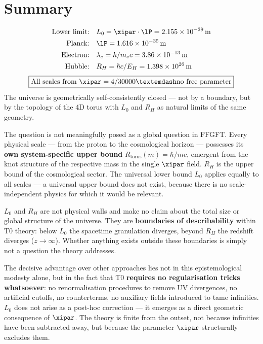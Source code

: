 \section{Summary}

\begin{keyresult}[Complete Scale Hierarchy from \texorpdfstring{$\xipar = 4/30000$}{xi = 4/30000}]
\begin{align}
	\text{Lower limit:} \quad & L_0 = \xipar \cdot \lP = 2{.}155 \times 10^{-39}\,\text{m} \notag \\
	\text{Planck:} \quad & \lP = 1{.}616 \times 10^{-35}\,\text{m} \notag \\
	\text{Electron:} \quad & \lambda_e = \hbar/m_e c = 3{.}86 \times 10^{-13}\,\text{m} \notag \\
	\text{Hubble:} \quad & R_H = \hbar c/E_H = 1{.}398 \times 10^{26}\,\text{m} \notag
\end{align}
\begin{equation}
	\boxed{\text{All scales from } \xipar = 4/30000 — \text{no free parameter}}
\end{equation}
The universe is geometrically self-consistently closed — not by a boundary, but by the topology of the 4D torus with $L_0$ and $R_H$ as natural limits of the same geometry.

\begin{keyresult}
The question is not meaningfully posed as a global question in FFGFT. Every physical scale — from the proton to the cosmological horizon — possesses its \textbf{own system-specific upper bound} $R_\text{torus}(m) = \hbar/mc$, emergent from the knot structure of the respective mass in the single $\xipar$ field. $R_H$ is the upper bound of the cosmological sector. The universal lower bound $L_0$ applies equally to all scales — a universal upper bound does not exist, because there is no scale-independent physics for which it would be relevant.
\end{keyresult}
\end{keyresult}

\begin{foundation}
$L_0$ and $R_H$ are not physical walls and make no claim about the total size or global structure of the universe. They are \textbf{boundaries of describability} within T0 theory: below $L_0$ the spacetime granulation diverges, beyond $R_H$ the redshift diverges ($z \to \infty$). Whether anything exists outside these boundaries is simply not a question the theory addresses.

The decisive advantage over other approaches lies not in this epistemological modesty alone, but in the fact that T0 \textbf{requires no regularisation tricks whatsoever}: no renormalisation procedures to remove UV divergences, no artificial cutoffs, no counterterms, no auxiliary fields introduced to tame infinities. $L_0$ does not arise as a post-hoc correction — it emerges as a direct geometric consequence of $\xipar$. The theory is finite from the outset, not because infinities have been subtracted away, but because the parameter $\xipar$ structurally excludes them.
\end{foundation}


